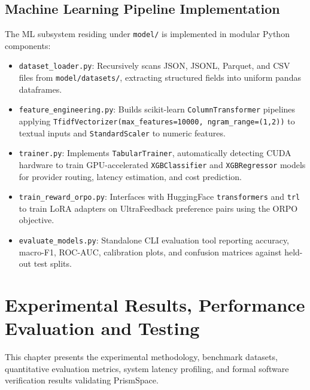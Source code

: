 \documentclass[12pt,a4paper]{report}
\begin{document}
\section{Machine Learning Pipeline Implementation}
The ML subsystem residing under \texttt{model/} is implemented in modular Python components:
\begin{itemize}
    \item \texttt{dataset\_loader.py}: Recursively scans JSON, JSONL, Parquet, and CSV files from \texttt{model/datasets/}, extracting structured fields into uniform pandas dataframes.
    \item \texttt{feature\_engineering.py}: Builds scikit-learn \texttt{ColumnTransformer} pipelines applying \texttt{TfidfVectorizer(max\_features=10000, ngram\_range=(1,2))} to textual inputs and \texttt{StandardScaler} to numeric features.
    \item \texttt{trainer.py}: Implements \texttt{TabularTrainer}, automatically detecting CUDA hardware to train GPU-accelerated \texttt{XGBClassifier} and \texttt{XGBRegressor} models for provider routing, latency estimation, and cost prediction.
    \item \texttt{train\_reward\_orpo.py}: Interfaces with HuggingFace \texttt{transformers} and \texttt{trl} to train LoRA adapters on UltraFeedback preference pairs using the ORPO objective.
    \item \texttt{evaluate\_models.py}: Standalone CLI evaluation tool reporting accuracy, macro-F1, ROC-AUC, calibration plots, and confusion matrices against held-out test splits.
\end{itemize}


\chapter{Experimental Results, Performance Evaluation and Testing}

This chapter presents the experimental methodology, benchmark datasets, quantitative evaluation metrics, system latency profiling, and formal software verification results validating PrismSpace.
\end{document}
